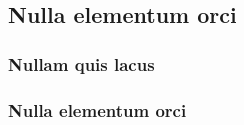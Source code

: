 \subsection{Nulla elementum orci}

\lipsum[62]

\subsubsection{Nullam quis lacus}

\lipsum[63-66]

\subsubsection{Nulla elementum orci}

\lipsum[67-69]
